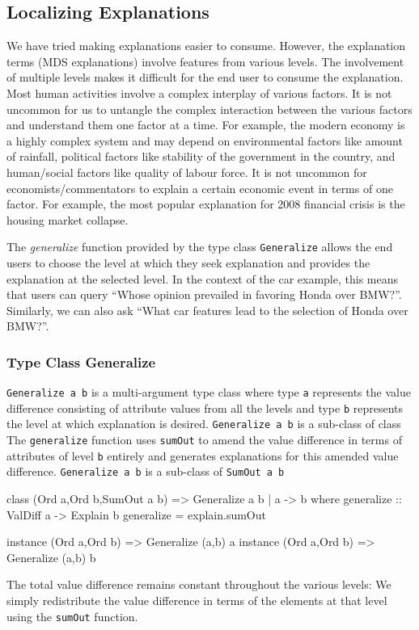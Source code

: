 \documentclass{jfp}
\newcommand{\prog}[1]{\texttt{#1}}
\begin{document}
\subsection{Localizing Explanations}
We have tried making explanations easier to consume. However, the explanation terms (MDS explanations) involve features from various levels. The involvement of multiple levels makes it difficult for the end user to consume the explanation. Most human activities involve a complex interplay of various factors. It is not uncommon for us to untangle the complex interaction between the various factors and understand them one factor at a time. For example, the modern economy is a highly complex system and may depend on environmental factors like amount of rainfall, political factors like stability of the government in the country, and human/social factors like quality of labour force. It is not uncommon for economists/commentators to explain a certain economic event in terms of one factor. For example, the most popular explanation for 2008 financial crisis is the housing market collapse. 

The \emph{generalize} function provided by the type class \prog{Generalize} allows the end users to choose the level at which they seek explanation and provides the explanation at the selected level. In the context of the car example, this means that users can query ``Whose opinion prevailed in favoring Honda over BMW?''. Similarly, we can also ask ``What car features lead to the selection of Honda over BMW?''. 
\subsubsection{Type Class Generalize}

\prog{Generalize a b} is a multi-argument type class where type \prog{a} represents the value difference consisting of attribute values from all the levels and type \prog{b} represents the level at which explanation is desired. \prog{Generalize a b} is a sub-class of class The \prog{generalize} function uses \prog{sumOut} to amend the value difference in terms of attributes of level \prog{b} entirely and generates explanations for this amended value difference. \prog{Generalize a b} is a sub-class of \prog{SumOut a b}
\begin{haskellcode}
class (Ord a,Ord b,SumOut a b) => Generalize a b | a -> b where
    generalize :: ValDiff a -> Explain b
    generalize = explain.sumOut

instance (Ord a,Ord b) => Generalize (a,b) a 
instance (Ord a,Ord b) => Generalize (a,b) b 
\end{haskellcode}
The total value difference remains constant throughout the various levels: We simply redistribute the value difference in terms of the elements at that level using the \prog{sumOut} function.
\end{document}
